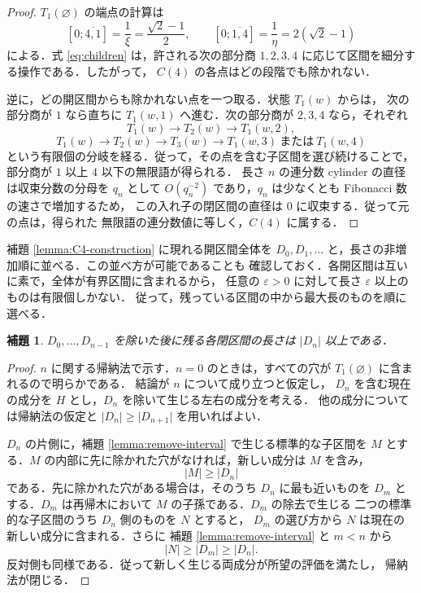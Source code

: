 \documentclass[10pt,a4paper]{ujarticle}
\newtheorem{lemma}[theorem]{補題}
\newcommand{\length}[1]{\lvert #1\rvert}
\begin{document}
\begin{proof}
$T_1(\varnothing)$ の端点の計算は
\[
  [0;\overline{4,1}]=\frac1\xi=\frac{\sqrt2-1}{2},\qquad
  [0;\overline{1,4}]=\frac1\eta=2(\sqrt2-1)
\]
による．式 \eqref{eq:children} は，許される次の部分商
$1,2,3,4$ に応じて区間を細分する操作である．したがって，
$C(4)$ の各点はどの段階でも除かれない．

逆に，どの開区間からも除かれない点を一つ取る．状態 $T_1(w)$ からは，
次の部分商が $1$ なら直ちに $T_1(w,1)$ へ進む．次の部分商が
$2,3,4$ なら，それぞれ
\[
  T_1(w)\longrightarrow T_2(w)\longrightarrow T_1(w,2),
\]
\[
  T_1(w)\longrightarrow T_2(w)\longrightarrow T_3(w)
  \longrightarrow T_1(w,3)\ \text{または}\ T_1(w,4)
\]
という有限個の分岐を経る．従って，その点を含む子区間を選び続けることで，
部分商が $1$ 以上 $4$ 以下の無限語が得られる．
長さ $n$ の連分数 cylinder の直径は収束分数の分母を $q_n$ として
$O(q_n^{-2})$ であり，$q_n$ は少なくとも Fibonacci 数の速さで増加するため，
この入れ子の閉区間の直径は $0$ に収束する．従って元の点は，得られた
無限語の連分数値に等しく，$C(4)$ に属する．
\end{proof}

補題 \ref{lemma:C4-construction} に現れる開区間全体を
$D_0,D_1,\ldots$ と，長さの非増加順に並べる．この並べ方が可能であることも
確認しておく．各開区間は互いに素で，全体が有界区間に含まれるから，
任意の $\varepsilon>0$ に対して長さ $\varepsilon$ 以上のものは有限個しかない．
従って，残っている区間の中から最大長のものを順に選べる．

\begin{lemma}
\label{lemma:component-lower-bound}
$D_0,\ldots,D_{n-1}$ を除いた後に残る各閉区間の長さは
$\length{D_n}$ 以上である．
\end{lemma}

\begin{proof}
$n$ に関する帰納法で示す．$n=0$ のときは，すべての穴が
$T_1(\varnothing)$ に含まれるので明らかである．
結論が $n$ について成り立つと仮定し，
$D_n$ を含む現在の成分を $H$ とし，$D_n$ を除いて生じる左右の成分を考える．
他の成分については帰納法の仮定と
$\length{D_n}\ge\length{D_{n+1}}$ を用いればよい．

$D_n$ の片側に，補題 \ref{lemma:remove-interval} で生じる標準的な子区間を
$M$ とする．$M$ の内部に先に除かれた穴がなければ，新しい成分は $M$ を含み，
\[
  \length M\ge\length{D_n}
\]
である．先に除かれた穴がある場合は，そのうち $D_n$ に最も近いものを
$D_m$ とする．$D_m$ は再帰木において $M$ の子孫である．$D_m$ の除去で生じる
二つの標準的な子区間のうち $D_n$ 側のものを $N$ とすると，
$D_m$ の選び方から $N$ は現在の新しい成分に含まれる．さらに
補題 \ref{lemma:remove-interval} と $m<n$ から
\[
  \length N\ge\length{D_m}\ge\length{D_n}.
\]
反対側も同様である．従って新しく生じる両成分が所望の評価を満たし，
帰納法が閉じる．
\end{proof}
\end{document}
